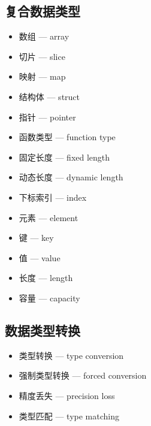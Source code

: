 \subsection{复合数据类型}
\begin{itemize}
\item 数组 — array
\item 切片 — slice
\item 映射 — map
\item 结构体 — struct
\item 指针 — pointer
\item 函数类型 — function type
\item 固定长度 — fixed length
\item 动态长度 — dynamic length
\item 下标索引 — index
\item 元素 — element
\item 键 — key
\item 值 — value
\item 长度 — length
\item 容量 — capacity
\end{itemize}

\subsection{数据类型转换}
\begin{itemize}
\item 类型转换 — type conversion
\item 强制类型转换 — forced conversion
\item 精度丢失 — precision loss
\item 类型匹配 — type matching
\end{itemize}

